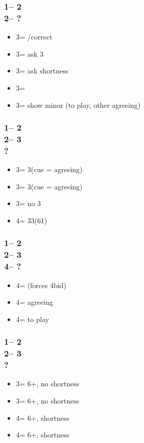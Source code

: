 \documentclass[12pt, a4paper]{article}
\begin{document}
\subsubsection*{1\nt -- 2\clubs\\
                2\nt -- ?}
\begin{itemize}
    \item 3\clubs = \pass/correct
    \item 3\diams = ask 3\major
    \item 3\hearts = ask shortness
    \item 3\spades = \nt
    \item 3\nt = show minor (\nt to play, other agreeing)
\end{itemize}

\subsubsection*{1\nt -- 2\clubs\\
                2\nt -- 3\diams\\
                ?}
\begin{itemize}
    \item 3\hearts = 3\hearts (cue = agreeing)
    \item 3\spades = 3\spades (cue = agreeing)
    \item 3\nt = no 3\major
    \item 4\clubs = 33(61)
\end{itemize}

\subsubsection*{1\nt -- 2\clubs\\
                2\nt -- 3\diams\\
                4\clubs -- ?}
\begin{itemize}
    \item 4\diams = \hearts (forces 4\hearts bid)
    \item 4\hearts = agreeing \spades
    \item 4\spades = to play
\end{itemize}

\subsubsection*{1\nt -- 2\clubs\\
                2\nt -- 3\hearts\\
                ?}
\begin{itemize}
    \item 3\spades = 6+\clubs, no \diams shortness
    \item 3\nt = 6+\diams, no \clubs shortness
    \item 4\clubs = 6+\clubs, \diams shortness
    \item 4\diams = 6+\diams, \clubs shortness
\end{itemize}
\end{document}

